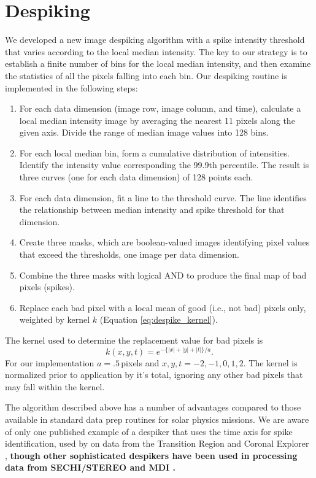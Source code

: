\documentclass[linenumbers,trackchanges]{aastex63}
\begin{document}
   	\appendix
   	\section{Despiking}\label{despike}
   	We developed a new image despiking algorithm with a spike intensity threshold that varies according to the local median intensity. The key to our strategy is to establish a finite number of bins for the local median intensity, and then examine the statistics of all the pixels falling into each bin. Our despiking routine is implemented in the following steps:
\begin{enumerate}
	\item For each data dimension (image row, image column, and time), calculate a local median intensity image by averaging the nearest 11 pixels along the given axis. Divide the range of median image values into 128 bins.
	\item For each local median bin, form a cumulative distribution of intensities. Identify the intensity value corresponding the 99.9th percentile. The result is three curves (one for each data dimension) of 128 points each. 
	\item For each data dimension, fit a line to the threshold curve. The line identifies the relationship between median intensity and spike threshold for that dimension.
	\item Create three masks, which are  boolean-valued images identifying pixel values that exceed the thresholds, one image per data dimension.
	\item Combine the three masks with logical AND to produce the final map of bad pixels (spikes). 
	\item Replace each bad pixel with a local mean of good (i.e., not bad) pixels only, weighted by kernel $k$ (Equation \ref{eq:despike_kernel}).
\end{enumerate}
The kernel used to determine the replacement value for bad pixels is
\begin{equation} \label{eq:despike_kernel}
k(x,y,t) = e^{-\lbrace|x|+|y|+|t|\rbrace/a}.
\end{equation}
For our implementation $a=.5$\,pixels and $x,y,t= -2, -1, 0, 1 , 2$.
The kernel is normalized prior to application by it's total, ignoring any other bad pixels that may fall within the kernel.

The algorithm described above has a number of advantages compared to those available in standard data prep routines for solar physics missions. 
We are aware of only one published example of a despiker that uses the time axis for spike identification, used by \citet{Aschwanden2000(trace_unspike_time)} on data from the Transition Region and Coronal Explorer \citep[TRACE]{handy1999}, \textbf{though other sophisticated despikers have been used in processing data from SECHI/STEREO \citep{Howard2008} and MDI \citep{DeForest2007}.}
\end{document}
